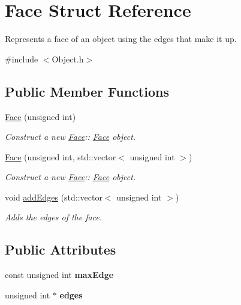 \hypertarget{structFace}{}\section{Face Struct Reference}
\label{structFace}


Represents a face of an object using the edges that make it up.  




{\ttfamily \#include $<$Object.\+h$>$}

\subsection*{Public Member Functions}
\begin{DoxyCompactItemize}
\item 
\hyperlink{structFace_af63f8976d1835512afc86f7211112b65}{Face} (unsigned int)
\begin{DoxyCompactList}\small\item\em Construct a new \hyperlink{structFace}{Face}\+:\+: \hyperlink{structFace}{Face} object. \end{DoxyCompactList}\item 
\hyperlink{structFace_af66f3b634d0899385a9f9235134f64aa}{Face} (unsigned int, std\+::vector$<$ unsigned int $>$)
\begin{DoxyCompactList}\small\item\em Construct a new \hyperlink{structFace}{Face}\+:\+: \hyperlink{structFace}{Face} object. \end{DoxyCompactList}\item 
void \hyperlink{structFace_a8922fa75e52752067106a191c74da79c}{add\+Edges} (std\+::vector$<$ unsigned int $>$)
\begin{DoxyCompactList}\small\item\em Adds the edges of the face. \end{DoxyCompactList}\end{DoxyCompactItemize}
\subsection*{Public Attributes}
\begin{DoxyCompactItemize}
\item 
\mbox{\label{structFace_a9d7aa6e0a49d8fc2077e2be1f13e0f6c}} 
const unsigned int {\bfseries max\+Edge}
\item 
\mbox{\label{structFace_aa1f7b0c514a042444c76029c4e01c939}} 
unsigned int $\ast$ {\bfseries edges}
\end{DoxyCompactItemize}


